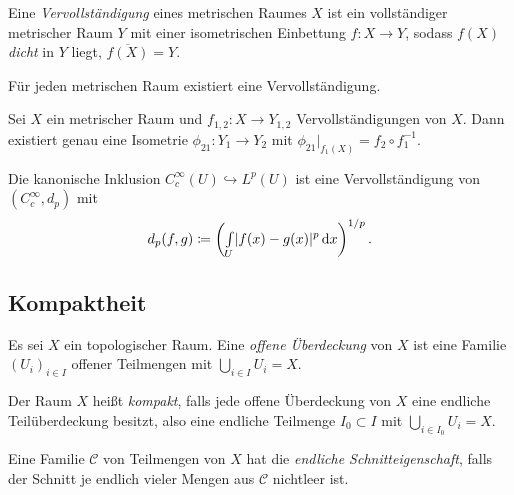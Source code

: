 \documentclass{cheat-sheet}
\begin{document}

\begin{defn}
  Eine \emph{Vervollständigung} eines metrischen Raumes $X$ ist ein vollständiger metrischer Raum $Y$ mit einer isometrischen Einbettung $f : X \to Y$, sodass $f(X)$ \emph{dicht} in $Y$ liegt, \dh{} $\overline{f(X)} = Y$.
\end{defn}

\begin{satz}
  Für jeden metrischen Raum existiert eine Vervollständigung. %
\end{satz}

\begin{prop}
  Sei $X$ ein metrischer Raum und $f_{1,2} : X \to Y_{1,2}$ Vervollständigungen von $X$. Dann existiert genau eine Isometrie $\phi_{21} : Y_1 \to Y_2$ mit $\phi_{21}|_{f_1(X)} = f_2 \circ f_1^{-1}$.
\end{prop}

\begin{bsp}
  Die kanonische Inklusion $C_c^{\infty}(U) \hookrightarrow L^p(U)$ ist eine Vervollständigung von $(C_c^{\infty}, d_p)$ mit
  \[ d_p(f, g) \coloneqq \left( {\textstyle \int\limits_{U}^{}} \lvert f(x) - g(x)\rvert^p \,\mathrm{d} x \right)^{1/p}. \]
\end{bsp}

\begin{samepage}

\section{Kompaktheit}

\begin{defn}
  Es sei $X$ ein topologischer Raum. Eine \emph{offene Überdeckung} von $X$ ist eine Familie $(U_i)_{i \in I}$ offener Teilmengen mit $\bigcup_{i \in I} U_i = X$.
\end{defn}

\begin{defn}
  Der Raum $X$ heißt \emph{kompakt}, falls jede offene Überdeckung von $X$ eine endliche Teilüberdeckung besitzt, also eine endliche Teilmenge $I_0 \subset I$ mit $\bigcup_{i \in I_0} U_i = X$.
\end{defn}

\begin{defn}
  Eine Familie $\mathcal{C}$ von Teilmengen von $X$ hat die \emph{endliche Schnitteigenschaft}, falls der Schnitt je endlich vieler Mengen aus $\mathcal{C}$ nichtleer ist.
\end{defn}

\end{samepage}
\end{document}
